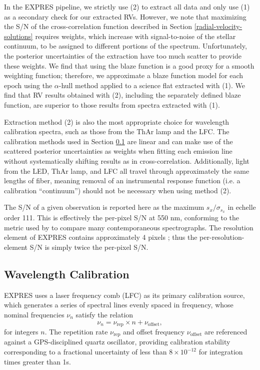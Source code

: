 In the EXPRES pipeline, we strictly use (2) to extract all data and only use (1) as a secondary check for our extracted RVs. However, we note that maximizing the S/N of the cross-correlation function described in Section \ref{radial-velocity-solutions} requires weights, which increase with signal-to-noise of the stellar continuum, to be assigned to different portions of the spectrum. Unfortunately, the posterior uncertainties of the extraction have too much scatter to provide these weights. We find that using the blaze function is a good proxy for a smooth weighting function; therefore, we approximate a blaze function model for each epoch using the $\alpha$-hull method \citep{xu_modeling_2019} applied to a science flat extracted with (1). We find that RV results obtained with (2), including the separately defined blaze function, are superior to those results from spectra extracted with (1).

Extraction method (2) is also the most appropriate choice for wavelength calibration spectra, such as those from the ThAr lamp and the LFC. The calibration methods used in Section \ref{wavelength-calibration} are linear and can make use of the scattered posterior uncertainties as weights when fitting each emission line without systematically shifting results as in cross-correlation. Additionally, light from the LED, ThAr lamp, and LFC all travel through approximately the same lengths of fiber, meaning removal of an instrumental response function (i.e. a calibration ``continuum'') should not be necessary when using method (2).

The S/N of a given observation is reported here as the maximum $s_x / \sigma_{s_x}$ in echelle order 111. This is effectively the per-pixel S/N at 550 nm, conforming to the metric used by \citet{fischer_state_2016} to compare many contemporaneous spectrographs. The resolution element of EXPRES contains approximately 4 pixels \citep{jurgenson_expres_2016}; thus the per-resolution-element S/N is simply twice the per-pixel S/N.

\hypertarget{wavelength-calibration}{%
\subsection{Wavelength Calibration}\label{wavelength-calibration}}

EXPRES uses a laser frequency comb (LFC) as its primary calibration source, which generates a series of spectral lines evenly spaced in frequency, whose nominal frequencies $\nu_n$ satisfy the relation
\begin{equation}\nu_n = \nu_\text{rep} \times n + \nu_\text{offset},\label{eq:lfc}\end{equation}
for integers $n$. The repetition rate $\nu_\text{rep}$ and offset frequency $\nu_\text{offset}$ are referenced against a GPS-disciplined quartz oscillator, providing calibration stability corresponding to a fractional uncertainty of less than $8\times10^{-12}$ for integration times greater than 1\unit{s}.

